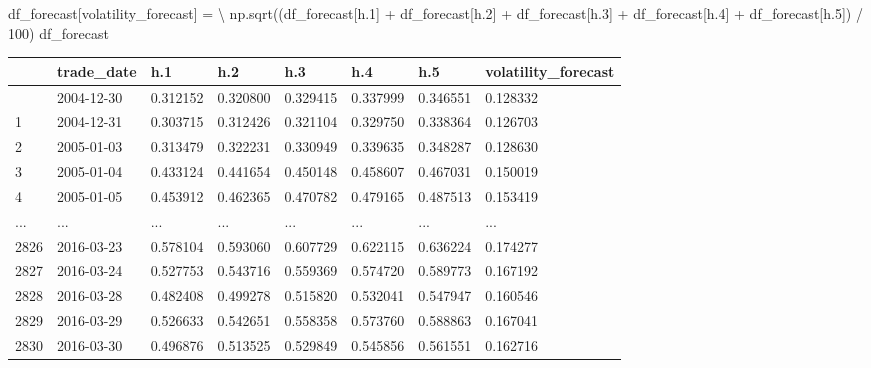 \documentclass[
  letterpaper,
  DIV=11,
  numbers=noendperiod]{scrreprt}
\newenvironment{Shaded}{\begin{snugshade}}{\end{snugshade}}
\newcommand{\DecValTok}[1]{\textcolor[rgb]{0.68,0.00,0.00}{#1}}
\newcommand{\NormalTok}[1]{\textcolor[rgb]{0.00,0.23,0.31}{#1}}
\newcommand{\OperatorTok}[1]{\textcolor[rgb]{0.37,0.37,0.37}{#1}}
\newcommand{\StringTok}[1]{\textcolor[rgb]{0.13,0.47,0.30}{#1}}
\begin{document}
\begin{Shaded}
\begin{Highlighting}[]
\NormalTok{df\_forecast[}\StringTok{\textquotesingle{}volatility\_forecast\textquotesingle{}}\NormalTok{] }\OperatorTok{=} \OperatorTok{\textbackslash{}}
\NormalTok{    np.sqrt((df\_forecast[}\StringTok{\textquotesingle{}h.1\textquotesingle{}}\NormalTok{] }\OperatorTok{+}\NormalTok{ df\_forecast[}\StringTok{\textquotesingle{}h.2\textquotesingle{}}\NormalTok{] }\OperatorTok{+}\NormalTok{ df\_forecast[}\StringTok{\textquotesingle{}h.3\textquotesingle{}}\NormalTok{] }\OperatorTok{+}\NormalTok{ df\_forecast[}\StringTok{\textquotesingle{}h.4\textquotesingle{}}\NormalTok{] }\OperatorTok{+}\NormalTok{ df\_forecast[}\StringTok{\textquotesingle{}h.5\textquotesingle{}}\NormalTok{]) }\OperatorTok{/} \DecValTok{100}\NormalTok{)}
\NormalTok{df\_forecast}
\end{Highlighting}
\end{Shaded}

\begin{longtable}[]{@{}llllllll@{}}
\toprule\noalign{}
& trade\_date & h.1 & h.2 & h.3 & h.4 & h.5 & volatility\_forecast \\
\midrule\noalign{}
\endhead
\bottomrule\noalign{}
\endlastfoot
0 & 2004-12-30 & 0.312152 & 0.320800 & 0.329415 & 0.337999 & 0.346551 &
0.128332 \\
1 & 2004-12-31 & 0.303715 & 0.312426 & 0.321104 & 0.329750 & 0.338364 &
0.126703 \\
2 & 2005-01-03 & 0.313479 & 0.322231 & 0.330949 & 0.339635 & 0.348287 &
0.128630 \\
3 & 2005-01-04 & 0.433124 & 0.441654 & 0.450148 & 0.458607 & 0.467031 &
0.150019 \\
4 & 2005-01-05 & 0.453912 & 0.462365 & 0.470782 & 0.479165 & 0.487513 &
0.153419 \\
... & ... & ... & ... & ... & ... & ... & ... \\
2826 & 2016-03-23 & 0.578104 & 0.593060 & 0.607729 & 0.622115 & 0.636224
& 0.174277 \\
2827 & 2016-03-24 & 0.527753 & 0.543716 & 0.559369 & 0.574720 & 0.589773
& 0.167192 \\
2828 & 2016-03-28 & 0.482408 & 0.499278 & 0.515820 & 0.532041 & 0.547947
& 0.160546 \\
2829 & 2016-03-29 & 0.526633 & 0.542651 & 0.558358 & 0.573760 & 0.588863
& 0.167041 \\
2830 & 2016-03-30 & 0.496876 & 0.513525 & 0.529849 & 0.545856 & 0.561551
& 0.162716 \\
\end{longtable}
\end{document}
